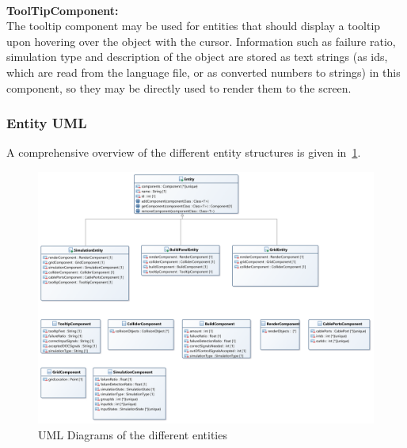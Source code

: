 \\
\textbf{ToolTipComponent:} \\
The tooltip component may be used for entities that should display a tooltip upon hovering over the object with the cursor.
Information such as failure ratio, simulation type and description of the object are stored as text strings (as ids, which are read
from the language file, or as converted numbers to strings) in this component, so they may be directly used to render them to
the screen.
\subsubsection{Entity UML}\label{subsubsec:entity-uml}
A comprehensive overview of the different entity structures is given in~\ref{fig:entities}.
\begin{figure}
    \centering
    \includegraphics[width=\textwidth]{Pictures/res/implementation/entities}
    \caption{UML Diagrams of the different entities}
    \label{fig:entities}
\end{figure}


